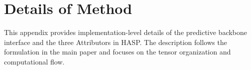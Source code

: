 \documentclass{article}
\begin{document}







\section{Details of Method}
\label{app:method-detail}

This appendix provides implementation-level details of the predictive backbone interface and the three Attributors in HASP. The description follows the formulation in the main paper and focuses on the tensor organization and computational flow.
\end{document}
